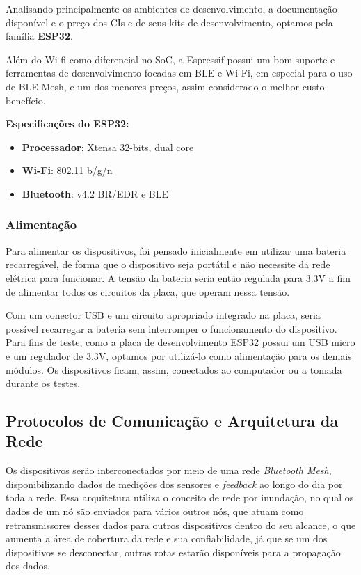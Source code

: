 \documentclass[../monografia.tex]{subfiles}
\begin{document}
Analisando principalmente os ambientes de desenvolvimento, a documentação disponível e o preço dos CIs e de seus kits de desenvolvimento, optamos pela família \textbf{ESP32}\cite{ESP32}. 

Além do Wi-fi como diferencial no SoC, a Espressif possui um bom suporte e ferramentas de desenvolvimento focadas em BLE e Wi-Fi, em especial para o uso de BLE Mesh, e um dos menores preços, assim considerado o melhor custo-benefício. 

\textbf{Especificações do ESP32:} \cite{ESP-datasheet}
\begin{itemize}
\item \textbf{Processador}: Xtensa 32-bits, dual core
\item \textbf{Wi-Fi}: 802.11 b/g/n
\item \textbf{Bluetooth}: v4.2 BR/EDR e BLE
\end{itemize}



\subsubsection{Alimentação}

Para alimentar os dispositivos, foi pensado inicialmente em utilizar uma bateria recarregável, de forma que o dispositivo seja portátil e não necessite da rede elétrica para funcionar. A tensão da bateria seria então regulada para 3.3V a fim de alimentar todos os circuitos da placa, que operam nessa tensão. 

Com um conector USB e um circuito apropriado integrado na placa, seria possível recarregar a bateria sem interromper o funcionamento do dispositivo. Para fins de teste, como a placa de desenvolvimento ESP32 possui um USB micro e um regulador de 3.3V, optamos por utilizá-lo como alimentação para os demais módulos. Os dispositivos ficam, assim, conectados ao computador ou a tomada durante os testes.

\subsection{Protocolos de Comunicação e Arquitetura da Rede}

Os dispositivos serão interconectados por meio de uma rede \textit{Bluetooth Mesh}, disponibilizando dados de medições dos sensores e \textit{feedback} ao longo do dia por toda a rede. Essa arquitetura utiliza o conceito de rede por inundação, no qual os dados de um nó são enviados para vários outros nós, que atuam como retransmissores desses dados para outros dispositivos dentro do seu alcance, o que aumenta a área de cobertura da rede e sua confiabilidade, já que se um dos dispositivos se desconectar, outras rotas estarão disponíveis para a propagação dos dados.
\end{document}
